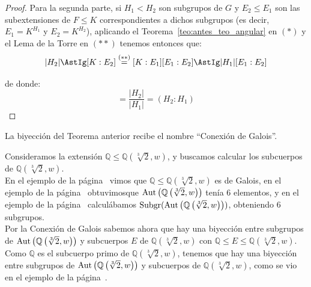 \begin{teo}
\begin{proof}
        \noindent
        Para la segunda parte, si $H_1< H_2$ son subgrupos de $G$ y $E_2\leq E_1$ son las subextensiones de $F\leq K$ correspondientes a dichos subgrupos (es decir, $E_1 = K^{H_1}$ y $E_2 = K^{H_2}$), aplicando el Teorema~\ref{teo:antes_teo_angular} en $(\ast)$ y el Lema de la Torre en $(\ast\ast)$ tenemos entonces que:
        \begin{equation*}
            |H_2| \AstIg [K:E_2] \stackrel{(\ast\ast)}{=} [K:E_1] [E_1:E_2] \AstIg |H_1|[E_1:E_2]
        \end{equation*}

        de donde:
        \begin{equation*}
            [E_1:E_2] = \dfrac{|H_2|}{|H_1|} = (H_2:H_1)
        \end{equation*}
    \end{proof}
\end{teo}

\begin{definicion}
    La biyección del Teorema anterior recibe el nombre ``Conexión de Galois''.
\end{definicion}

\begin{ejemplo}
    Consideramos la extensión $\mathbb{Q}\leq \mathbb{Q}\left(\sqrt[3]{2},w\right)$, y buscamos calcular los subcuerpos de $\mathbb{Q}\left(\sqrt[3]{2},w\right)$.\\

    En el ejemplo de la página~\pageref{ejemplo:extensiones_de_galois} vimos que $\mathbb{Q}\leq \mathbb{Q}\left(\sqrt[3]{2},w\right)$ es de Galois, en el ejemplo de la página~\pageref{ejemplo:aut_sqrt3_2} obtuvimosque $\operatorname{Aut}\left(\mathbb{Q}\left(\sqrt[3]{2},w\right)\right)$ tenía 6 elementos, y en el ejemplo de la página~\pageref{ejemplo:subcuerpos_fijos} calculábamos $\operatorname{Subgr}(\operatorname{Aut}\left(\mathbb{Q}\left(\sqrt[3]{2},w\right)\right))$, obteniendo 6 subgrupos.\\ 

    Por la Conexión de Galois sabemos ahora que hay una biyección entre subgrupos de $\operatorname{Aut}\left(\mathbb{Q}\left(\sqrt[3]{2},w\right)\right)$ y subcuerpos $E$ de $\mathbb{Q}\left(\sqrt[3]{2},w\right)$ con $\mathbb{Q}\leq E\leq \mathbb{Q}\left(\sqrt[3]{2},w\right)$. Como $\mathbb{Q}$ es el subcuerpo primo de $\mathbb{Q}\left(\sqrt[3]{2},w\right)$, tenemos que hay una biyección entre subgrupos de $\operatorname{Aut}\left(\mathbb{Q}\left(\sqrt[3]{2},w\right)\right)$ y subcuerpos de $\mathbb{Q}\left(\sqrt[3]{2},w\right)$, como se vio en el ejemplo de la página~\pageref{ejemplo:subcuerpos_fijos}.
\end{ejemplo}

